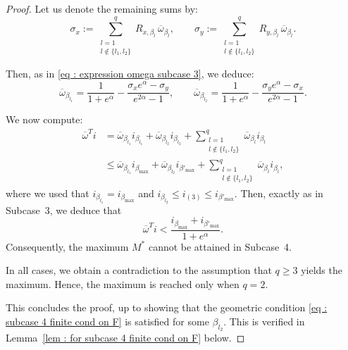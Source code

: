 \documentclass[a4paper, 11pt]{article}
\theoremstyle{definition}
\begin{document}
{\begin{proof}
Let us denote the remaining sums by:
\[
\sigma_x := \sum_{\substack{l=1 \\ l \notin \{l_1,l_2\}}}^q R_{x,\beta_l} \, \overline{\omega}_{\beta_l}, \qquad 
\sigma_y := \sum_{\substack{l=1 \\ l \notin \{l_1,l_2\}}}^q R_{y,\beta_l} \, \overline{\omega}_{\beta_l}.
\]

Then, as in \eqref{eq : expression omega subcase 3}, we deduce:
\begin{equation*}
\overline{\omega}_{\beta_{l_1}} = \frac{1}{1 + e^\alpha} - \frac{\sigma_x e^\alpha - \sigma_y}{e^{2\alpha} - 1}, \qquad
\overline{\omega}_{\beta_{l_2}} = \frac{1}{1 + e^\alpha} - \frac{\sigma_y e^\alpha - \sigma_x}{e^{2\alpha} - 1}.
\end{equation*}

We now compute:
\begin{align*}
\overline{\omega}^T i &= \overline{\omega}_{\beta_{l_1}} i_{\beta_{l_1}} + \overline{\omega}_{\beta_{l_2}} i_{\beta_{l_2}} 
+ \sum_{\substack{l=1 \\ l \notin \{l_1,l_2\}}}^q \overline{\omega}_{\beta_l} i_{\beta_l} \\
&\le \overline{\omega}_{\beta_{l_1}} i_{\beta_{\max}} + \overline{\omega}_{\beta_{l_2}} i_{\beta'_{\max}} 
+ \sum_{\substack{l=1 \\ l \notin \{l_1,l_2\}}}^q \overline{\omega}_{\beta_l} i_{\beta_l},
\end{align*}
where we used that $i_{\beta_{l_1}} = i_{\beta_{\max}}$ and $i_{\beta_{l_2}} \le i_{(3)} \le i_{\beta'_{\max}}$. Then, exactly as in Subcase~3, we deduce that
\[
\overline{\omega}^T i < \frac{i_{\beta_{\max}} + i_{\beta'_{\max}}}{1 + e^\alpha}.
\]
Consequently, the maximum $M^*$ cannot be attained in Subcase~4.
\medskip 

In all cases, we obtain a contradiction to the assumption that $q \ge 3$ yields the maximum. Hence, the maximum is reached only when $q = 2$.

\medskip

This concludes the proof, up to showing that the geometric condition \eqref{eq : subcase 4 finite cond on F} is satisfied for some $\beta_{l_2}$.  
This is verified in Lemma~\ref{lem : for subcase 4 finite cond on F} below.




\end{proof}




}
\end{document}
